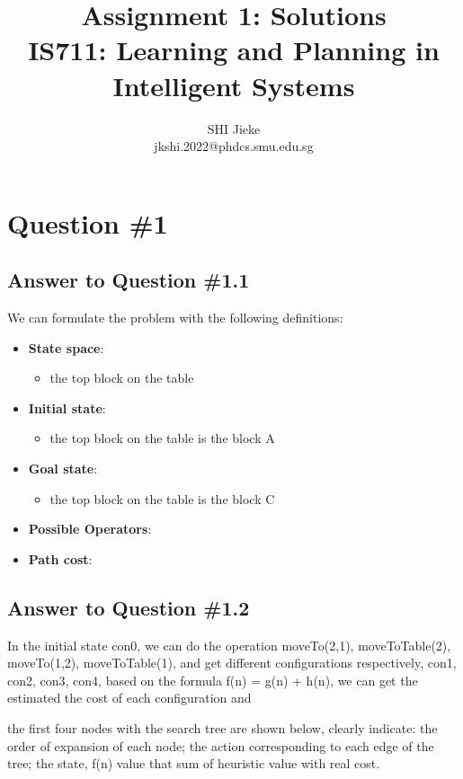 \documentclass[conference]{styles/acmsiggraph}
\title{Assignment 1: Solutions \\ {IS711: Learning and Planning in Intelligent Systems}}
\author{SHI Jieke \\ jkshi.2022@phdcs.smu.edu.sg}
\begin{document}
\maketitle
\vspace{-0.15cm}
\section{Question \#1}

\subsection{Answer to Question \#1.1}

We can formulate the problem with the following definitions:
\begin{itemize}[itemsep=0.1em, leftmargin=*]
	\item \textbf{State space}:
		\begin{itemize}
			\item the top block on the table
		\end{itemize} 
	\item \textbf{Initial state}:
		\begin{itemize}
			\item the top block on the table is the block A
		\end{itemize}
	\item \textbf{Goal state}:
		\begin{itemize}
			\item the top block on the table is the block C
		\end{itemize}
	\item \textbf{Possible Operators}:
	\item \textbf{Path cost}:
\end{itemize}

\subsection{Answer to Question \#1.2}
In the initial state con0, we can do the operation moveTo(2,1), moveToTable(2), moveTo(1,2), 
moveToTable(1), and get different configurations respectively, con1, con2, con3, con4, based 
on the formula f(n) = g(n) + h(n), we can get the estimated the cost of each configuration and 

the first four nodes with the search tree are shown below, clearly indicate: 
the order of expansion of each node; 
the action corresponding to each edge of the tree; 
the state, 
f(n) value that sum of heuristic value with real cost.
\end{document}
